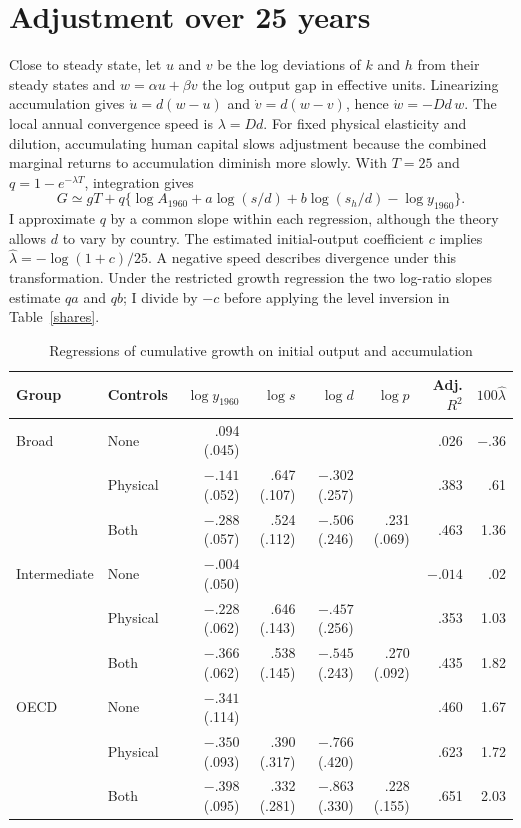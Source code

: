 \documentclass[11pt]{article}
\begin{document}
\section{Adjustment over 25 years}
Close to steady state, let $u$ and $v$ be the log deviations of $k$ and $h$ from their steady states and $w=\alpha u+\beta v$ the log output gap in effective units. Linearizing accumulation gives $\dot u=d(w-u)$ and $\dot v=d(w-v)$, hence $\dot w=-Dd\,w$. The local annual convergence speed is $\lambda=Dd$. For fixed physical elasticity and dilution, accumulating human capital slows adjustment because the combined marginal returns to accumulation diminish more slowly. With $T=25$ and $q=1-e^{-\lambda T}$, integration gives
\begin{equation}
 G\simeq gT+q\{\log A_{1960}+a\log(s/d)+b\log(s_h/d)-\log y_{1960}\}.\label{trans}
\end{equation}
I approximate $q$ by a common slope within each regression, although the theory allows $d$ to vary by country. The estimated initial-output coefficient $c$ implies $\widehat\lambda=-\log(1+c)/25$. A negative speed describes divergence under this transformation. Under the restricted growth regression the two log-ratio slopes estimate $qa$ and $qb$; I divide by $-c$ before applying the level inversion in Table~\ref{shares}.

\begin{table}[ht]
\centering\footnotesize
\caption{Regressions of cumulative growth on initial output and accumulation}\label{grtab}
\begin{tabular}{llrrrrrr}
\toprule
Group&Controls&$\log y_{1960}$&$\log s$&$\log d$&$\log p$&Adj. $R^2$&$100\widehat\lambda$\\
\midrule
Broad&None&.094 (.045)&&&&.026&$-.36$\\
&Physical&$-.141$ (.052)&.647 (.107)&$-.302$ (.257)&&.383&.61\\
&Both&$-.288$ (.057)&.524 (.112)&$-.506$ (.246)&.231 (.069)&.463&1.36\\
Intermediate&None&$-.004$ (.050)&&&&$-.014$&.02\\
&Physical&$-.228$ (.062)&.646 (.143)&$-.457$ (.256)&&.353&1.03\\
&Both&$-.366$ (.062)&.538 (.145)&$-.545$ (.243)&.270 (.092)&.435&1.82\\
OECD&None&$-.341$ (.114)&&&&.460&1.67\\
&Physical&$-.350$ (.093)&.390 (.317)&$-.766$ (.420)&&.623&1.72\\
&Both&$-.398$ (.095)&.332 (.281)&$-.863$ (.330)&.228 (.155)&.651&2.03\\
\bottomrule
\end{tabular}
\end{table}
\end{document}
